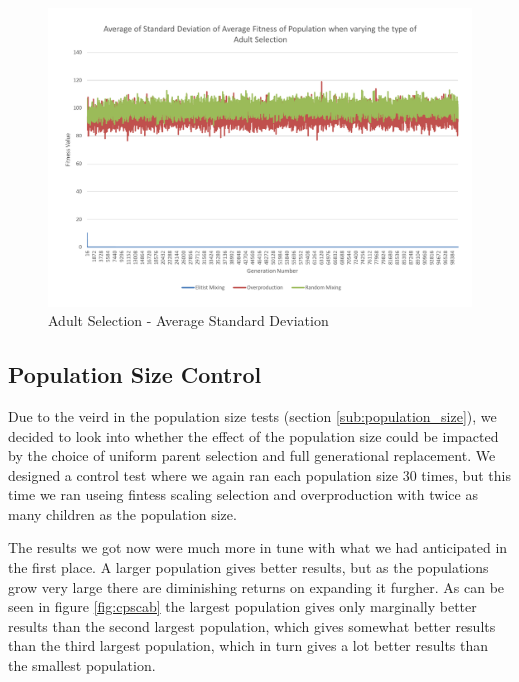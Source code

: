 \begin{figure}[thbp]
	\centerline{\includegraphics[width=\paperwidth]{figures/CircleTests/CircleTestAdultSelectionAverageStandardDeviation.pdf}}
	\caption{Adult Selection - Average Standard Deviation}
	\label{fig:ctasasd}
\end{figure}

\clearpage

\subsection{Population Size Control} %
\label{sub:population_size_control}

Due to the veird in the population size tests (section \ref{sub:population_size}), we decided to look into whether the effect of the population size could be impacted by the choice of uniform parent selection and full generational replacement. We designed a control test where we again ran each population size 30 times, but this time we ran useing fintess scaling selection and overproduction with twice as many children as the population size.

The results we got now were much more in tune with what we had anticipated in the first place. A larger population gives better results, but as the populations grow very large there are diminishing returns on expanding it furgher. As can be seen in figure \ref{fig:cpscab} the largest population gives only marginally better results than the second largest population, which gives somewhat better results than the third largest population, which in turn gives a lot better results than the smallest population.

